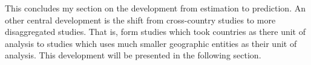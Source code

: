\documentclass[a4paper]{article}
\begin{document}


This concludes my section on the development from estimation to prediction. An other central development is the shift from cross-country studies to more disaggregated studies. That is, form studies which took countries as there unit of analysis to studies which uses much smaller geographic entities as their unit of analysis. This development will be presented in the following section.\par

 
\end{document}

